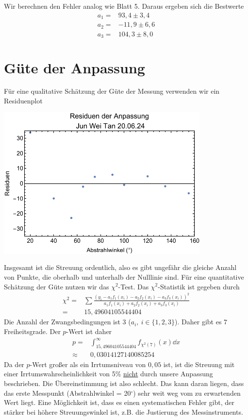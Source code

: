 \documentclass[prb,12pt]{revtex4-2}
\theoremstyle{definition}
\theoremstyle{definition}
\begin{document}
Wir berechnen den Fehler analog wie Blatt 5. Daraus ergeben sich die Bestwerte
\begin{align*}
	a_1=&93,4\pm 3,4\\
	a_2=&-11,9\pm 6,6\\
	a_3=&104,3\pm 8,0
\end{align*}
\section{Güte der Anpassung}
Für eine qualitative Schätzung der Güte der Messung verwenden wir ein Residuenplot

\begin{center}
	\includegraphics[width=0.8\textwidth]{plt2.pdf}
\end{center}

Insgesamt ist die Streuung ordentlich, also es gibt ungefähr die gleiche Anzahl von Punkte, die oberhalb und unterhalb der Nulllinie sind. Für eine quantitative Schätzung der Güte nutzen wir das $\chi^2$-Test. Das $\chi^2$-Statistik ist gegeben durch
\begin{align*}
	\chi^2=&\sum \frac{(y_i - a_1 f_1(x_i) - a_2 f_2(x_i) - a_3 f_3(x_i))^2}{a_1 f_1(x_i) + a_2 f_2(x_i) + a_3 f_3(x_i)}\\
	=&15,49604105544404
\end{align*}
Die Anzahl der Zwangsbedingungen ist 3 ($a_i,~i\in \{1,2,3\}$). Daher gibt es $7$ Freiheitsgrade. Der $p$-Wert ist daher
\begin{align*}
	p=&\int_{15,49604105544404}^\infty f_{\chi^2(7)}(x)\dd{x}\\
	\approx&0,03014127140085254
\end{align*}
Da der $p$-Wert großer als ein Irrtumsniveau von $0,05$ ist, ist die Streuung mit einer Irrtumswahrscheinlichkeit von 5\% \uline{nicht} durch unsere Anpassung beschrieben. Die Übereinstimmung ist also schlecht. Das kann daran liegen, dass das erste Messpunkt (Abstrahlwinkel = 20$^\circ$) sehr weit weg vom zu erwartenden Wert liegt. Eine Möglichkeit ist, dass es einen systematischen Fehler gibt, der stärker bei höhere Streuungswinkel ist, z.B. die Justierung des Messinstruments.
\end{document}

